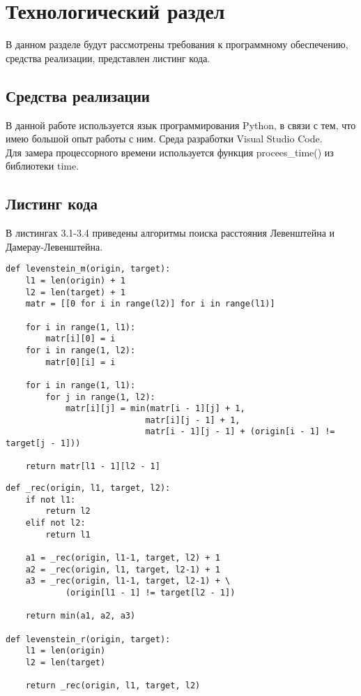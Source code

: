 \chapter{Технологический раздел}
\label{cha:impl}
В данном разделе будут рассмотрены требования к программному обеспечению, средства реализации, представлен листинг кода.
\section{Средства реализации}
В данной работе используется язык программирования Python, в связи с тем, что имею большой опыт работы с ним. Среда разработки Visual Studio Code.\\
Для замера процессорного времени используется функция procees\_time() из библиотеки time.

\section{Листинг кода}
В листингах 3.1-3.4 приведены алгоритмы поиска расстояния Левенштейна и Дамерау-Левенштейна.
\begin{lstlisting}[caption= Матричный алгоритм поиска расстояния Левенштейна]
def levenstein_m(origin, target):
	l1 = len(origin) + 1
	l2 = len(target) + 1
	matr = [[0 for i in range(l2)] for i in range(l1)]
	
	for i in range(1, l1):
		matr[i][0] = i
	for i in range(1, l2):
		matr[0][i] = i
	
	for i in range(1, l1):
		for j in range(1, l2):
			matr[i][j] = min(matr[i - 1][j] + 1, 
							matr[i][j - 1] + 1,
							matr[i - 1][j - 1] + (origin[i - 1] != target[j - 1]))
	
	return matr[l1 - 1][l2 - 1]
\end{lstlisting}

\begin{lstlisting}[caption= Рекурсивный алгоритм поиска расстояния Левенштейна]
def _rec(origin, l1, target, l2):
	if not l1:
		return l2
	elif not l2:
		return l1
	
	a1 = _rec(origin, l1-1, target, l2) + 1
	a2 = _rec(origin, l1, target, l2-1) + 1
	a3 = _rec(origin, l1-1, target, l2-1) + \
			(origin[l1 - 1] != target[l2 - 1])
	
	return min(a1, a2, a3)

def levenstein_r(origin, target):
	l1 = len(origin)
	l2 = len(target)
	
	return _rec(origin, l1, target, l2)

\end{lstlisting}

